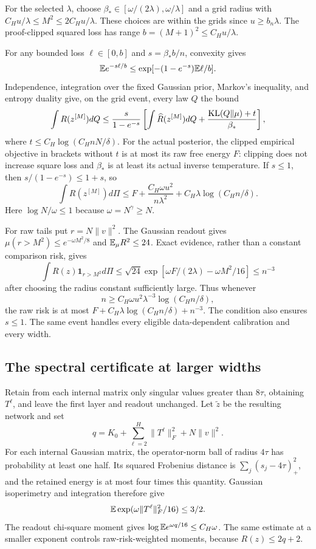 For the selected $\lambda$, choose $\beta_*\in[\omega/(2\lambda),\omega/\lambda]$ and a grid radius with $C_Hu/\lambda\le M^2\le2C_Hu/\lambda$. These choices are within the grids since $u\ge b_n\lambda$. The proof-clipped squared loss has range $b=(M+1)^2\le C_Hu/\lambda$.

For any bounded loss $\ell\in[0,b]$ and $s=\beta_*b/n$, convexity gives
\[
 \mathbb E e^{-s\ell/b}\le\exp[-(1-e^{-s})\mathbb E\ell/b].
\]
Independence, integration over the fixed Gaussian prior, Markov's inequality, and entropy duality give, on the grid event, every law $Q$ the bound
\[
 \int R(z^{[M]})dQ\le\frac{s}{1-e^{-s}}
 \left[\int\widehat R(z^{[M]})dQ+
             \frac{\operatorname{KL}(Q\Vert\mu)+t}{\beta_*}\right],
\]
where $t\le C_H\log(C_HnN/\delta)$. For the actual posterior, the clipped empirical objective in brackets without $t$ is at most its raw free energy $F$: clipping does not increase square loss and $\beta_*$ is at least its actual inverse temperature. If $s\le1$, then $s/(1-e^{-s})\le1+s$, so
\begin{equation}
 \int R(z^{[M]})d\Pi\le F+
       \frac{C_H\omega u^2}{n\lambda^2}
       +C_H\lambda\log(C_Hn/\delta).
 \label{eq:localized-finite-width}
\end{equation}
Here $\log N/\omega\le1$ because $\omega=N^\gamma\ge N$.

For raw tails put $r=N\|v\|^2$. The Gaussian readout gives
$\mu(r>M^2)\le e^{-\omega M^2/8}$ and $\mathbb E_\mu R^2\le24$. Exact evidence, rather than a constant comparison risk, gives
\[
 \int R(z)\mathbf1_{r>M^2}d\Pi
 \le\sqrt{24}\exp[\omega F/(2\lambda)-\omega M^2/16]
 \le n^{-3}
\]
after choosing the radius constant sufficiently large. Thus whenever
\begin{equation}
 n\ge C_H\omega u^2\lambda^{-3}\log(C_Hn/\delta),
 \label{eq:small-localized-budget}
\end{equation}
the raw risk is at most $F+C_H\lambda\log(C_Hn/\delta)+n^{-3}$. The condition also ensures $s\le1$. The same event handles every eligible data-dependent calibration and every width.

\subsection{The spectral certificate at larger widths}
Retain from each internal matrix only singular values greater than $8\tau$, obtaining $T^\ell$, and leave the first layer and readout unchanged. Let $\widetilde z$ be the resulting network and set
\[
 q=K_0+\sum_{\ell=2}^H\|T^\ell\|_F^2+N\|v\|^2.
\]
For each internal Gaussian matrix, the operator-norm ball of radius $4\tau$ has probability at least one half. Its squared Frobenius distance is $\sum_j(s_j-4\tau)_+^2$, and the retained energy is at most four times this quantity. Gaussian isoperimetry and integration therefore give
\[
 \mathbb E\exp(\omega\|T^\ell\|_F^2/16)\le3/2.
\]
The readout chi-square moment gives
$\log\mathbb E e^{\omega q/16}\le C_H\omega$.
The same estimate at a smaller exponent controls raw-risk-weighted moments, because $R(z)\le2q+2$.

